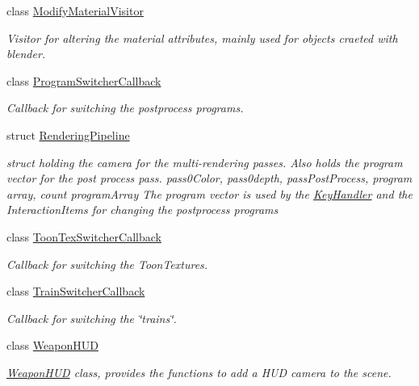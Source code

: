 \begin{DoxyCompactItemize}
class \hyperlink{classbrtr_1_1_modify_material_visitor}{Modify\+Material\+Visitor}
\begin{DoxyCompactList}\small\item\em Visitor for altering the material attributes, mainly used for objects craeted with blender. \end{DoxyCompactList}\item 
class \hyperlink{classbrtr_1_1_program_switcher_callback}{Program\+Switcher\+Callback}
\begin{DoxyCompactList}\small\item\em Callback for switching the postprocess programs. \end{DoxyCompactList}\item 
struct \hyperlink{structbrtr_1_1_rendering_pipeline}{Rendering\+Pipeline}
\begin{DoxyCompactList}\small\item\em struct holding the camera for the multi-\/rendering passes. Also holds the program vector for the post process pass. pass0\+Color, pass0depth, pass\+Post\+Process, program array, count program\+Array The program vector is used by the \hyperlink{classbrtr_1_1_key_handler}{Key\+Handler} and the Interaction\+Items for changing the postprocess programs \end{DoxyCompactList}\item 
class \hyperlink{classbrtr_1_1_toon_tex_switcher_callback}{Toon\+Tex\+Switcher\+Callback}
\begin{DoxyCompactList}\small\item\em Callback for switching the Toon\+Textures. \end{DoxyCompactList}\item 
class \hyperlink{classbrtr_1_1_train_switcher_callback}{Train\+Switcher\+Callback}
\begin{DoxyCompactList}\small\item\em Callback for switching the \char`\"{}trains\char`\"{}. \end{DoxyCompactList}\item 
class \hyperlink{classbrtr_1_1_weapon_h_u_d}{Weapon\+H\+U\+D}
\begin{DoxyCompactList}\small\item\em \hyperlink{classbrtr_1_1_weapon_h_u_d}{Weapon\+H\+U\+D} class, provides the functions to add a H\+U\+D camera to the scene. \end{DoxyCompactList}\end{DoxyCompactItemize}
